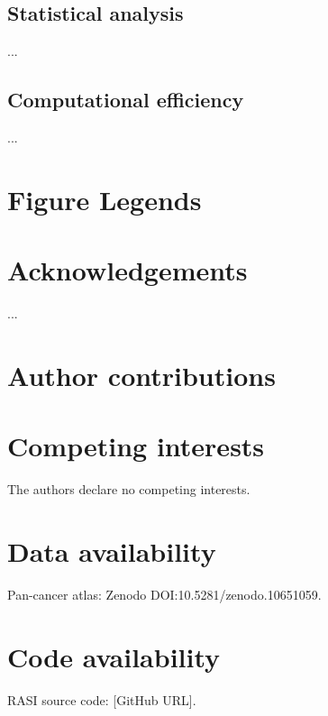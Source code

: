 \documentclass[10pt]{article}
\begin{document}
\subsection{Statistical analysis}
...

\subsection{Computational efficiency}
...

\section*{Figure Legends}

\section*{Acknowledgements}
...

\section*{Author contributions}

\section*{Competing interests}
The authors declare no competing interests.

\section*{Data availability}
Pan-cancer atlas: Zenodo DOI:10.5281/zenodo.10651059.

\section*{Code availability}
RASI source code: [GitHub URL].

\end{document}
